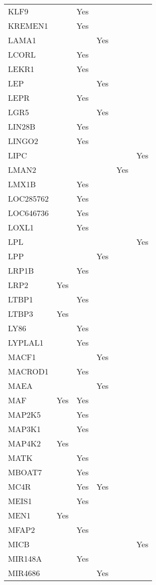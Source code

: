 \documentclass[]{report}
\begin{document}
\begin{longtable}[t]{llllll}
KLF9 &  & Yes &  &  & \\
KREMEN1 &  & Yes &  &  & \\
LAMA1 &  &  & Yes &  & \\
LCORL &  & Yes &  &  & \\
LEKR1 &  & Yes &  &  & \\
LEP &  &  & Yes &  & \\
LEPR &  & Yes &  &  & \\
LGR5 &  &  & Yes &  & \\
LIN28B &  & Yes &  &  & \\
LINGO2 &  & Yes &  &  & \\
LIPC &  &  &  &  & Yes\\
LMAN2 &  &  &  & Yes & \\
LMX1B &  & Yes &  &  & \\
LOC285762 &  & Yes &  &  & \\
LOC646736 &  & Yes &  &  & \\
LOXL1 &  & Yes &  &  & \\
LPL &  &  &  &  & Yes\\
LPP &  &  & Yes &  & \\
LRP1B &  & Yes &  &  & \\
LRP2 & Yes &  &  &  & \\
LTBP1 &  & Yes &  &  & \\
LTBP3 & Yes &  &  &  & \\
LY86 &  & Yes &  &  & \\
LYPLAL1 &  & Yes &  &  & \\
MACF1 &  &  & Yes &  & \\
MACROD1 &  & Yes &  &  & \\
MAEA &  &  & Yes &  & \\
MAF & Yes & Yes &  &  & \\
MAP2K5 &  & Yes &  &  & \\
MAP3K1 &  & Yes &  &  & \\
MAP4K2 & Yes &  &  &  & \\
MATK &  & Yes &  &  & \\
MBOAT7 &  & Yes &  &  & \\
MC4R &  & Yes & Yes &  & \\
MEIS1 &  & Yes &  &  & \\
MEN1 & Yes &  &  &  & \\
MFAP2 &  & Yes &  &  & \\
MICB &  &  &  &  & Yes\\
MIR148A &  & Yes &  &  & \\
MIR4686 &  &  & Yes &  & \\

\end{longtable}
\end{document}
